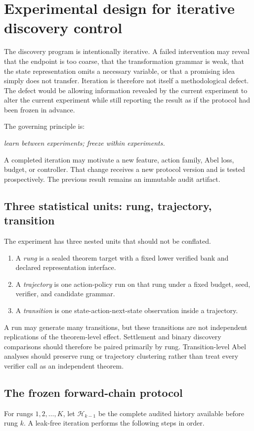 \section{Experimental design for iterative discovery control}\label{sec:experimental-design}

The discovery program is intentionally iterative. A failed intervention may reveal that the endpoint is too coarse, that the transformation grammar is weak, that the state representation omits a necessary variable, or that a promising idea simply does not transfer. Iteration is therefore not itself a methodological defect. The defect would be allowing information revealed by the current experiment to alter the current experiment while still reporting the result as if the protocol had been frozen in advance.

The governing principle is:
\begin{center}
\emph{learn between experiments; freeze within experiments.}
\end{center}
A completed iteration may motivate a new feature, action family, Abel loss, budget, or controller. That change receives a new protocol version and is tested prospectively. The previous result remains an immutable audit artifact.

\subsection{Three statistical units: rung, trajectory, transition}
The experiment has three nested units that should not be conflated.
\begin{enumerate}
\item A \emph{rung} is a sealed theorem target with a fixed lower verified bank and declared representation interface.
\item A \emph{trajectory} is one action-policy run on that rung under a fixed budget, seed, verifier, and candidate grammar.
\item A \emph{transition} is one state-action-next-state observation inside a trajectory.
\end{enumerate}
A run may generate many transitions, but these transitions are not independent replications of the theorem-level effect. Settlement and binary discovery comparisons should therefore be paired primarily by rung. Transition-level Abel analyses should preserve rung or trajectory clustering rather than treat every verifier call as an independent theorem.

\subsection{The frozen forward-chain protocol}
For rungs $1,2,\ldots,K$, let $\mathcal H_{k-1}$ be the complete audited history available before rung $k$. A leak-free iteration performs the following steps in order.

